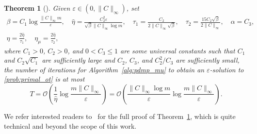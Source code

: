 \documentclass[10pt]{article}
\theoremstyle{plain}
\newtheorem{theorem}{Theorem}[section]
\theoremstyle{definition}
\theoremstyle{remark}
\begin{document}
\begin{theorem}[{\cite[Theorem 2.2]{liFastComputationOptimal2025}}]\label{thm:main_convergence_li}
    Given $\varepsilon\in(0,\|C\|_\infty)$, set
    \begin{equation}
    \begin{gathered}
        \beta=C_1\log\frac{\|C\|_\infty m}{\varepsilon},\quad \hat\eta=\frac{C_2^2\varepsilon }{\sqrt{\beta}\|C\|_\infty \log m},\quad\tau_1=\frac{C_2}{2\|C\|_\infty\sqrt{\beta}},\quad \tau_2=\frac{15C_2\sqrt{\beta}}{2\|C\|_\infty},\quad \alpha=C_3,\\
        \eta =\frac{2\hat\eta}{\tau_{1}},\quad \eta_\mu=\frac{2\hat\eta}{\tau_{2}},
    \end{gathered}\label{def:li_parameters}
    \end{equation}
    where $C_1>0$, $C_2>0$, and $0<C_3\leq 1$ are some universal constants such that $C_1$ and $C_2\sqrt{C_1}$ are sufficiently large and $C_2$, $C_3$, and $C_2^2/C_3$ are sufficiently small, the number of iterations for Algorithm~\ref{alg:pdmp_mu} to obtain an $\varepsilon$-solution to \eqref{prob:primal_ot} is at most
    \begin{equation*}
        T=\mathcal{O}\left(\frac{1}{\hat\eta}\log\frac{m\|C\|_\infty}{\varepsilon}\right)=\mathcal{O}\left(\frac{\|C\|_\infty\log m}{\varepsilon}\log\frac{m\|C\|_\infty}{\varepsilon}\right).
    \end{equation*}
\end{theorem}
We refer interested readers to~\cite{liFastComputationOptimal2025} for the full proof of Theorem~\ref{thm:main_convergence_li}, which is quite technical and beyond the scope of this work.

\newpage
% 
\end{document}
